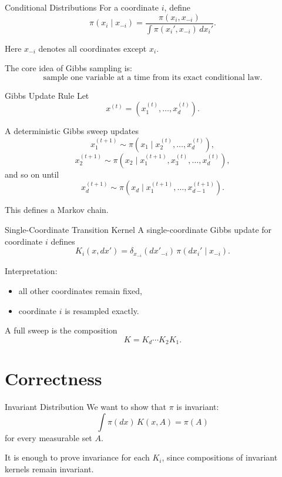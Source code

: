 \documentclass[aspectratio=169]{beamer}
\begin{document}
\begin{frame}{Conditional Distributions}
For a coordinate \(i\), define
\[
\pi(x_i\mid x_{-i})
=
\frac{\pi(x_i,x_{-i})}{\int \pi(x_i',x_{-i})\,dx_i'}.
\]

Here \(x_{-i}\) denotes all coordinates except \(x_i\).

The core idea of Gibbs sampling is:
\[
\text{sample one variable at a time from its exact conditional law.}
\]
\end{frame}

\begin{frame}{Gibbs Update Rule}
Let
\[
x^{(t)}=(x_1^{(t)},\dots,x_d^{(t)}).
\]

A deterministic Gibbs sweep updates
\[
x_1^{(t+1)} \sim \pi(x_1\mid x_2^{(t)},\dots,x_d^{(t)}),
\]
\[
x_2^{(t+1)} \sim \pi(x_2\mid x_1^{(t+1)},x_3^{(t)},\dots,x_d^{(t)}),
\]
and so on until
\[
x_d^{(t+1)} \sim \pi(x_d\mid x_1^{(t+1)},\dots,x_{d-1}^{(t+1)}).
\]

This defines a Markov chain.
\end{frame}

\begin{frame}{Single-Coordinate Transition Kernel}
A single-coordinate Gibbs update for coordinate \(i\) defines
\[
K_i(x,dx')=\delta_{x_{-i}}(dx'_{-i})\,\pi(dx_i'\mid x_{-i}).
\]

Interpretation:
\begin{itemize}
    \item all other coordinates remain fixed,
    \item coordinate \(i\) is resampled exactly.
\end{itemize}

A full sweep is the composition
\[
K=K_d\cdots K_2K_1.
\]
\end{frame}

\section{Correctness}

\begin{frame}{Invariant Distribution}
We want to show that \(\pi\) is invariant:
\[
\int \pi(dx)\,K(x,A)=\pi(A)
\]
for every measurable set \(A\).

It is enough to prove invariance for each \(K_i\), since compositions of invariant kernels remain invariant.
\end{frame}
\end{document}
